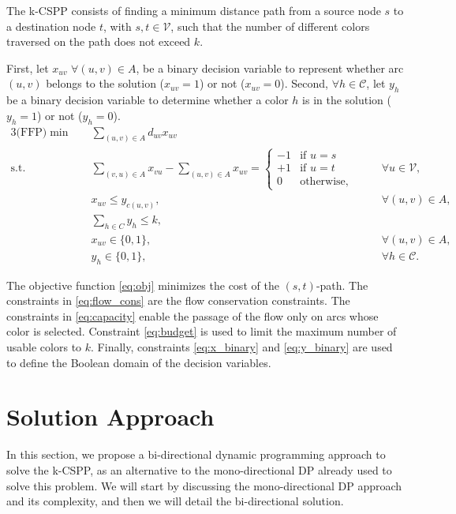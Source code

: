 \documentclass[pdflatex,sn-mathphys-num]{sn-jnl}
\begin{document}
The k-CSPP consists of finding a minimum distance path
from a source node $s$ to a destination node $t$, with $s,t \in \mathcal{V}$, such
that the number of different colors traversed on the path does not
exceed $k$.

First, let $x_{uv}$ $\forall (u,v) \in A$, be a binary decision variable to represent whether arc $(u,v)$ belongs to the solution ($x_{uv} = 1$) or not ($x_{uv} = 0$).
Second, $\forall h \in \mathcal{C}$, let $y_h$ be a binary decision variable to determine whether a color $h$ is in the solution ($y_h = 1$) or not ($y_h = 0$).
\begin{alignat}{3}
    \text{(FFP)}
 \min \quad & \sum_{(u,v) \in A} d_{uv}x_{uv} \label{eq:obj} \\
\text{s.t.} \quad & \sum_{(v,u) \in A} x_{vu} - \sum_{(u,v) \in A} x_{uv} = 
\begin{cases} 
-1 & \text{if } u = s \\ 
+1 & \text{if } u = t \\ 
0 & \text{otherwise,} 
\end{cases} & \quad & \forall u \in \mathcal{V}, \label{eq:flow_cons} \\
& x_{uv} \le y_{c(u,v)}, && \forall (u,v) \in A, \label{eq:capacity} \\
& \sum_{h \in C} y_h \le k, && \label{eq:budget} \\
& x_{uv} \in \{0, 1\}, && \forall (u,v) \in A, \label{eq:x_binary} \\
& y_h \in \{0, 1\}, && \forall h \in \mathcal{C}. \label{eq:y_binary}
\end{alignat}

The objective function \eqref{eq:obj} minimizes the cost of the $(s,t)$-path. The constraints in \eqref{eq:flow_cons} are the flow conservation constraints.
The constraints in \eqref{eq:capacity} enable the passage of the flow only on arcs
whose color is selected. Constraint \eqref{eq:budget} is used to limit the maximum
number of usable colors to $k$. Finally, constraints \eqref{eq:x_binary} and \eqref{eq:y_binary} are used
to define the Boolean domain of the decision variables.

\section{Solution Approach}
In this section, we propose a bi-directional dynamic programming approach to solve the k-CSPP,
as an alternative to the mono-directional DP \cite{Ferone2021} already used to solve this problem. We will start
by discussing the mono-directional DP approach and its complexity, and then we will detail the bi-directional solution.
\end{document}
